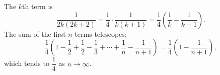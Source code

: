 The $k$th term is
\[\dfrac{1}{2k(2k+2)}=\dfrac14\cdot\dfrac{1}{k(k+1)}=\dfrac14\left(\dfrac1k-\dfrac1{k+1}\right).\]
The sum of the first $n$ terms telescopes:
\[\dfrac14\left(1-\dfrac12+\dfrac12-\dfrac13+\cdots+\dfrac1n-\dfrac1{n+1}\right)=\dfrac14\left(1-\dfrac1{n+1}\right),\]
which tends to $\boxed{\dfrac14}$ as $n\to\infty$.
